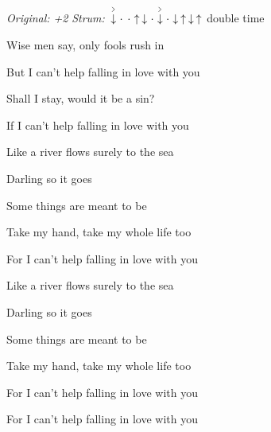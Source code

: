\begin{song}


\begin{headerbox}
\RaiseBoxWithAccents
{} \quad
\textit{Original: +2} \quad
\textit{Strum:} $\AccentDown\Miss\Miss\Up\Down\Miss\AccentDown\Miss\Down\Up\Down\Up$ double time
\end{headerbox}

\begin{hchordbox}
\end{hchordbox}

\Large

\bigskip

Wise men say, only fools rush in \par
But I can't help falling in love with you 

\bigskip

Shall I stay, would it be a sin? \par
If I can't help falling in love with you 

\bigskip

Like a river flows surely to the sea \par
{}Darling so it goes \par
{}Some things  are meant to be 

\bigskip

Take my hand, take my whole life too \par
For I can't help falling in love with you 

\bigskip

Like a river flows surely to the sea \par
{}Darling so it goes \par
{}Some things  are meant to be 

\bigskip

Take my hand, take my whole life too \par
For I can't help falling in love with you \par
For I can't help falling in love with you \par

\end{song}